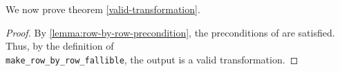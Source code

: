 \documentclass{article}
\begin{document}
We now prove theorem \ref{valid-transformation}. 
\begin{proof} 
By \ref{lemma:row-by-row-precondition}, the preconditions of  are satisfied. 
Thus, by the definition of \\\texttt{make\_row\_by\_row\_fallible}, the output is a valid transformation. 
\end{proof} 
 
\end{document}
